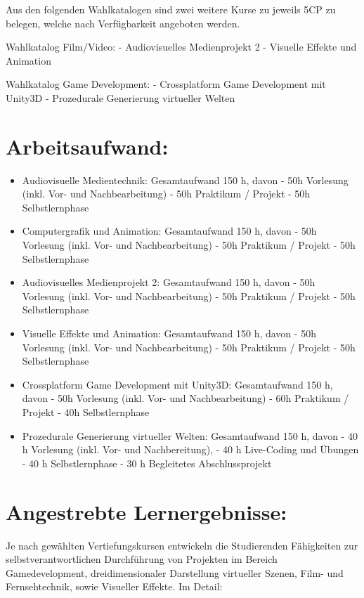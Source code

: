 Aus den folgenden Wahlkatalogen sind zwei weitere Kurse zu jeweils 5CP
zu belegen, welche nach Verfügbarkeit angeboten werden.

Wahlkatalog Film/Video: - Audiovisuelles Medienprojekt 2 - Visuelle
Effekte und Animation

Wahlkatalog Game Development: - Crossplatform Game Development mit
Unity3D - Prozedurale Generierung virtueller Welten

\section{Arbeitsaufwand:}\label{arbeitsaufwand-24}

\begin{itemize}
\tightlist
\item
  Audiovisuelle Medientechnik: Gesamtaufwand 150 h, davon - 50h
  Vorlesung (inkl. Vor- und Nachbearbeitung) - 50h Praktikum / Projekt -
  50h Selbstlernphase
\item
  Computergrafik und Animation: Gesamtaufwand 150 h, davon - 50h
  Vorlesung (inkl. Vor- und Nachbearbeitung) - 50h Praktikum / Projekt -
  50h Selbstlernphase
\item
  Audiovisuelles Medienprojekt 2: Gesamtaufwand 150 h, davon - 50h
  Vorlesung (inkl. Vor- und Nachbearbeitung) - 50h Praktikum / Projekt -
  50h Selbstlernphase
\item
  Visuelle Effekte und Animation: Gesamtaufwand 150 h, davon - 50h
  Vorlesung (inkl. Vor- und Nachbearbeitung) - 50h Praktikum / Projekt -
  50h Selbstlernphase
\item
  Crossplatform Game Development mit Unity3D: Gesamtaufwand 150 h, davon
  - 50h Vorlesung (inkl. Vor- und Nachbearbeitung) - 60h Praktikum /
  Projekt - 40h Selbstlernphase
\item
  Prozedurale Generierung virtueller Welten: Gesamtaufwand 150 h, davon
  - 40 h Vorlesung (inkl. Vor- und Nachbereitung), - 40 h Live-Coding
  und Übungen - 40 h Selbstlernphase - 30 h Begleitetes Abschlussprojekt
\end{itemize}

\section{Angestrebte
Lernergebnisse:}\label{angestrebte-lernergebnisse-29}

Je nach gewählten Vertiefungskursen entwickeln die Studierenden
Fähigkeiten zur selbstverantwortlichen Durchführung von Projekten im
Bereich Gamedevelopment, dreidimensionaler Darstellung virtueller
Szenen, Film- und Fernsehtechnik, sowie Visueller Effekte. Im Detail:

